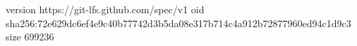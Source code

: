 version https://git-lfs.github.com/spec/v1
oid sha256:72e629dc6ef4e9c40b77742d3b5da08e317b714c4a912b72877960ed94c1d9c3
size 699236
